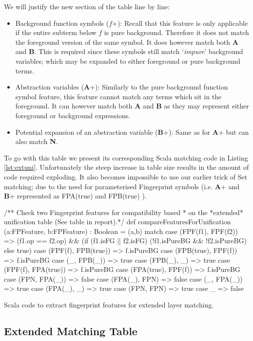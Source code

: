 We will justify the new section of the table line by line:
\begin{itemize}
\item Background function symbols ($f$+): Recall that this feature is only applicable
if the entire subterm below $f$ is pure background. Therefore it does not
match the foreground version of the same symbol. It does however match both
\textbf{A} and \textbf{B}. This is required since these symbols still match `\emph{impure}' background variables;
which may be expanded to either foreground or pure background terms.
\item Abstraction variables (\textbf{A}+): Similarly to the pure background function symbol
feature, this feature cannot match any terms which sit in the foreground. It can however
match both \textbf{A} and \textbf{B} as they may represent either foreground or background
expressions.
\item Potential expansion of an abstraction variable (\textbf{B}+): Same as for \textbf{A}+
but can also match \textbf{N}.
\end{itemize}

To go with this table we present its corresponding Scala matching code in Listing \ref{lst:extuni}.
Unfortunately the steep increase in table size results in the amount of code required exploding.
It also becomes impossible to use our earlier trick of Set matching; due to the need for parameterised
Fingerprint symbols (i.e. \textbf{A}+ and \textbf{B}+ represented as FPA(true) and FPB(true) ).
\begin{listing}[H]
\begin{scalacode}
 /** Check two Fingerprint features for compatibility based
   * on the *extended* unification table (See table in report).*/
  def compareFeaturesForUnification
      (a:FPFeature, b:FPFeature) : Boolean = 
  (a,b) match {
    case (FPF(f1), FPF(f2))    => (f1.op == f2.op) && 
                                  (if (f1.isFG || f2.isFG) 
                                      (!f1.isPureBG && !f2.isPureBG)
                                   else true)
    case (FPF(f), FPB(true)) => f.isPureBG
    case (FPB(true), FPF(f)) => f.isPureBG
    case (_, FPB(_))         => true
    case (FPB(_), _)         => true
    case (FPF(f), FPA(true)) => f.isPureBG
    case (FPA(true), FPF(f)) => f.isPureBG
    case (FPN, FPA(_))       => false
    case (FPA(_), FPN)       => false
    case (_, FPA(_))         => true
    case (FPA(_), _)         => true
    case (FPN, FPN)          => true
    case _                   => false
  }
\end{scalacode}
\caption{Scala code to extract fingerprint features for extended layer matching.}
\label{lst:extuni}
\end{listing}

\subsection{Extended Matching Table}

